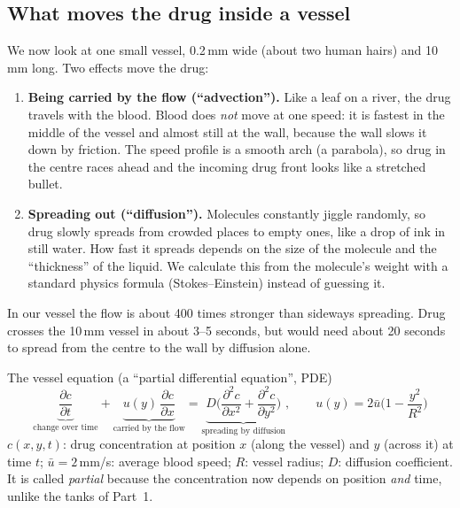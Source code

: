 \documentclass[10.5pt]{article}
\begin{document}
\subsection{What moves the drug inside a vessel}
We now look at one small vessel, 0.2\,mm wide (about two human hairs) and 10\,mm long. Two effects move the drug:
\begin{enumerate}
\item \textbf{Being carried by the flow (``advection'').} Like a leaf on a river, the drug travels with the
blood. Blood does \emph{not} move at one speed: it is fastest in the middle of the vessel and almost still at
the wall, because the wall slows it down by friction. The speed profile is a smooth arch (a parabola), so drug in
the centre races ahead and the incoming drug front looks like a stretched bullet.
\item \textbf{Spreading out (``diffusion'').} Molecules constantly jiggle randomly, so drug slowly spreads from
crowded places to empty ones, like a drop of ink in still water. How fast it spreads depends on the size of the molecule
and the ``thickness'' of the liquid. We calculate this from the molecule's weight with a standard physics formula
(Stokes--Einstein) instead of guessing it.
\end{enumerate}
In our vessel the flow is about 400 times stronger than sideways spreading. Drug crosses the 10\,mm vessel in
about 3--5 seconds, but would need about 20 seconds to spread from the centre to the wall by diffusion alone.

\begin{mathbox}{The vessel equation (a ``partial differential equation'', PDE)}
\vspace{-4pt}
\[
\underbrace{\frac{\partial c}{\partial t}}_{\text{change over time}}
+\underbrace{u(y)\,\frac{\partial c}{\partial x}}_{\text{carried by the flow}}
=\underbrace{D\Big(\frac{\partial^2 c}{\partial x^2}+\frac{\partial^2 c}{\partial y^2}\Big)}_{\text{spreading by diffusion}},
\qquad u(y)=2\bar u\Big(1-\frac{y^2}{R^2}\Big)
\]
{\footnotesize $c(x,y,t)$: drug concentration at position $x$ (along the vessel) and $y$ (across it) at time $t$;
$\bar u=2$\,mm/s: average blood speed; $R$: vessel radius; $D$: diffusion coefficient. It is called \emph{partial}
because the concentration now depends on position \emph{and} time, unlike the tanks of Part~1.}
\end{mathbox}
\end{document}

